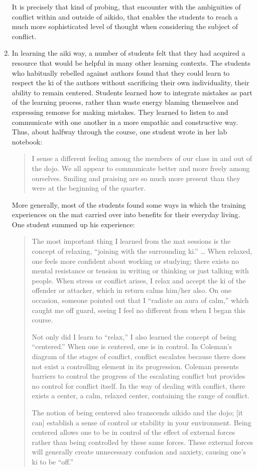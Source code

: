 \begin{enumerate}
\begin{quote}
\end{quote}
It is precisely that kind of probing, that encounter with the ambiguities of conflict within and outside of aikido, that enables the students to reach a much more sophisticated level of thought when considering the subject of conflict.
\item In learning the aiki way, a number of students felt that they had acquired a resource that would be helpful in many other learning contexts. The students who habitually rebelled against authors found that they could learn to respect the ki of the authors without sacrificing their own individuality, their ability to remain centered. Students learned how to integrate mistakes as part of the learning process, rather than waste energy blaming themselves and expressing remorse for making mistakes. They learned to listen to and communicate with one another in a more empathic and constructive way. Thus, about halfway through the course, one student wrote in her lab notebook:
\begin{quote}
I sense a different feeling among the members of our class in and out of the dojo. We all appear to communicate better and more freely among ourselves. Smiling and praising are so much more present than they were at the beginning of the quarter. 
\end{quote}
More generally, most of the students found some ways in which the training experiences on the mat carried over into benefits for their everyday living. One student summed up his experience:
\begin{quote}
The most important thing I learned from the mat sessions is the concept of relaxing, ``joining with the surrounding ki.'' \ldots{} When relaxed, one feels more confident about working or studying; there exists no mental resistance or tension in writing or thinking or just talking with people. When stress or conflict arises, I relax and accept the ki of the offender or attacker, which in return calms him/her also. On one occasion, someone pointed out that I ``radiate an aura of calm,'' which caught me off guard, seeing I feel no different from when I began this course.

Not only did I learn to ``relax,'' I also learned the concept of being ``centered.'' When one is centered, one is in control. In Coleman's diagram of the stages of conflict, conflict escalates because there does not exist a controlling element in its progression. Coleman presents barriers to control the progress of the escalating conflict but provides no control for conflict itself. In the way of dealing with conflict, there exists a center, a calm, relaxed center, containing the range of conflict.

The notion of being centered also transcends aikido and the dojo; [it can] establish a sense of control or stability in your environment. Being centered allows one to be in control of the effect of external forces rather than being controlled by these same forces. These external forces will generally create unnecessary confusion and anxiety, causing one's ki to be ``off.''
\end{quote}
\end{enumerate}

